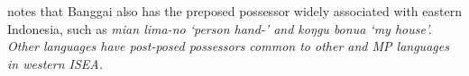 \citet[68]{Mead2003b} notes that Banggai also has the preposed
possessor widely associated with eastern Indonesia,
such as \it{mian lima-no} ‘person hand-’
and \it{koŋgu bonua} ‘my house’.
Other  languages have post-posed possessors
common to other 
and MP languages in western ISEA.
